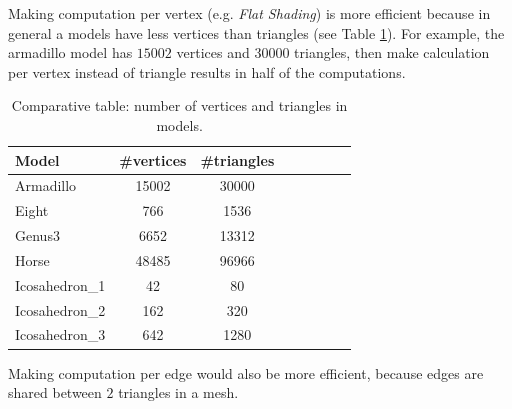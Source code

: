 Making computation per vertex (e.g. \textit{Flat Shading}) is more efficient because in general a models have less vertices than triangles (see Table \ref{table:model-table-vertices}).
For example, the armadillo model has $15002$ vertices and $30000$ triangles, then make calculation per vertex instead of triangle results in half of the computations.

\begin{table}[!h]
    \centering
\begin{tabular}{l*{6}{c}r}
    \centering
    Model              & \#vertices & \#triangles \\
    \hline
    Armadillo          & 15002 & 30000 \\
    Eight              & 766 & 1536 \\
    Genus3             & 6652 & 13312  \\
    Horse              & 48485 &  96966\\
    Icosahedron\_1      &  42 & 80 \\
    Icosahedron\_2      &  162 & 320 \\
    Icosahedron\_3      & 642 &  1280
\end{tabular}
\caption{Comparative table: number of vertices and triangles in models.}
\label{table:model-table-vertices}
\end{table}

Making computation per edge would also be more efficient, because edges are shared between $2$ triangles in a mesh.

